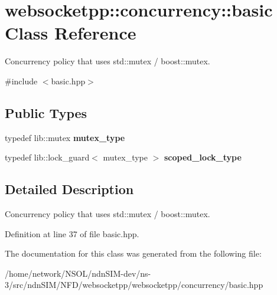 \hypertarget{classwebsocketpp_1_1concurrency_1_1basic}{}\section{websocketpp\+:\+:concurrency\+:\+:basic Class Reference}
\label{classwebsocketpp_1_1concurrency_1_1basic}


Concurrency policy that uses std\+::mutex / boost\+::mutex.  




{\ttfamily \#include $<$basic.\+hpp$>$}

\subsection*{Public Types}
\begin{DoxyCompactItemize}
\item 
typedef lib\+::mutex {\bfseries mutex\+\_\+type}\hypertarget{classwebsocketpp_1_1concurrency_1_1basic_aa017bc1a233b748f5e0e56b5e8a8c0bc}{}\label{classwebsocketpp_1_1concurrency_1_1basic_aa017bc1a233b748f5e0e56b5e8a8c0bc}

\item 
typedef lib\+::lock\+\_\+guard$<$ mutex\+\_\+type $>$ {\bfseries scoped\+\_\+lock\+\_\+type}\hypertarget{classwebsocketpp_1_1concurrency_1_1basic_ac5f4f16695c8c578face2e4dac291b93}{}\label{classwebsocketpp_1_1concurrency_1_1basic_ac5f4f16695c8c578face2e4dac291b93}

\end{DoxyCompactItemize}


\subsection{Detailed Description}
Concurrency policy that uses std\+::mutex / boost\+::mutex. 

Definition at line 37 of file basic.\+hpp.



The documentation for this class was generated from the following file\+:\begin{DoxyCompactItemize}
\item 
/home/network/\+N\+S\+O\+L/ndn\+S\+I\+M-\/dev/ns-\/3/src/ndn\+S\+I\+M/\+N\+F\+D/websocketpp/websocketpp/concurrency/basic.\+hpp\end{DoxyCompactItemize}
